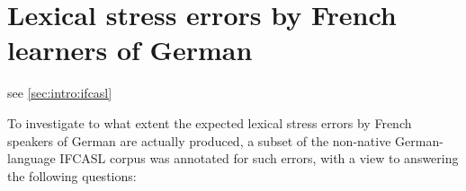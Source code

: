 %
%
\chapter{Lexical stress errors by French learners of German }
\label{chap:lexstress}



%	
	

	 see \cref{sec:intro:ifcasl}

	To investigate to what extent the expected lexical stress errors by French speakers of German are actually produced, a subset of the non-native German-language IFCASL corpus was annotated for such errors, with a view to answering the following questions:

